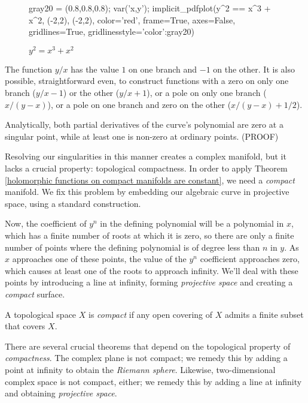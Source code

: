 \begin{figure}[H]
\begin{center}
\begin{sagecode}
gray20 = (0.8,0.8,0.8);
var('x,y');
implicit_pdfplot(y^2 == x^3 + x^2, (-2,2), (-2,2), color='red', frame=True, axes=False, gridlines=True, gridlinesstyle={'color':gray20})
\end{sagecode}
\end{center}
\caption{$y^2 = x^3 + x^2$}
\end{figure}

The function $y/x$ has the value $1$ on one branch and $-1$
on the other.  It is also possible, straightforward even, to construct functions
with a zero on only one branch ($y/x - 1$) or the other
($y/x + 1$), or a pole on only one branch ($x/(y-x)$),
or a pole on one branch and zero on the other ($x/(y-x) + 1/2$).
\endexample


Analytically, both partial derivatives of the curve's polynomial are
zero at a singular point, while at least one is non-zero at ordinary
points. (PROOF)



Resolving our singularities in this manner creates a complex
manifold, but it lacks a crucial property: topological compactness.
In order to apply Theorem \ref{holomorphic functions on compact
manifolds are constant}, we need a {\it compact} manifold.
We fix this problem by embedding our algebraic curve
in projective space, using a standard construction.


Now, the coefficient of $y^n$ in the defining polynomial will be a
polynomial in $x$, which has a finite number of roots at which it is
zero, so there are only a finite number of points where the defining
polynomial is of degree less than $n$ in $y$.  As $x$ approaches one
of these points, the value of the $y^n$ coefficient approaches zero,
which causes at least one of the roots to approach infinity.  We'll
deal with these points by introducing a line at infinity, forming
{\it projective space} and creating a {\it compact} surface.

A topological space $X$ is {\it compact} if any open covering
of $X$ admits a finite subset that covers $X$.
\enddefinition

There are several crucial theorems that depend on the topological
property of {\it compactness}.  The complex plane is not compact; we
remedy this by adding a point at infinity to obtain the {\it Riemann
sphere}.  Likewise, two-dimensional complex space is not compact,
either; we remedy this by adding a line at infinity and obtaining {\it
projective space}.

